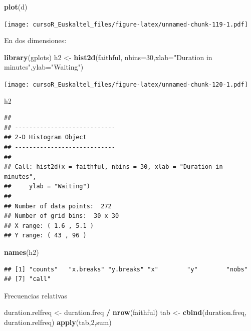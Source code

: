 \documentclass[]{book}
\newenvironment{Shaded}{\begin{snugshade}}{\end{snugshade}}
\newcommand{\KeywordTok}[1]{\textcolor[rgb]{0.13,0.29,0.53}{\textbf{#1}}}
\newcommand{\DataTypeTok}[1]{\textcolor[rgb]{0.13,0.29,0.53}{#1}}
\newcommand{\DecValTok}[1]{\textcolor[rgb]{0.00,0.00,0.81}{#1}}
\newcommand{\StringTok}[1]{\textcolor[rgb]{0.31,0.60,0.02}{#1}}
\newcommand{\OperatorTok}[1]{\textcolor[rgb]{0.81,0.36,0.00}{\textbf{#1}}}
\newcommand{\NormalTok}[1]{#1}
\begin{document}
\begin{Shaded}
\begin{Highlighting}[]
\KeywordTok{plot}\NormalTok{(d)}
\end{Highlighting}
\end{Shaded}

\texttt{[image: cursoR\_Euskaltel\_files/figure-latex/unnamed-chunk-119-1.pdf]}

En dos dimensiones:

\begin{Shaded}
\begin{Highlighting}[]
\KeywordTok{library}\NormalTok{(gplots)}
\NormalTok{h2 <-}\StringTok{ }\KeywordTok{hist2d}\NormalTok{(faithful, }\DataTypeTok{nbins=}\DecValTok{30}\NormalTok{,}\DataTypeTok{xlab=}\StringTok{"Duration in minutes"}\NormalTok{,}\DataTypeTok{ylab=}\StringTok{"Waiting"}\NormalTok{)}
\end{Highlighting}
\end{Shaded}

\texttt{[image: cursoR\_Euskaltel\_files/figure-latex/unnamed-chunk-120-1.pdf]}

\begin{Shaded}
\begin{Highlighting}[]
\NormalTok{h2}
\end{Highlighting}
\end{Shaded}

\begin{verbatim}
## 
## ----------------------------
## 2-D Histogram Object
## ----------------------------
## 
## Call: hist2d(x = faithful, nbins = 30, xlab = "Duration in minutes", 
##     ylab = "Waiting")
## 
## Number of data points:  272 
## Number of grid bins:  30 x 30 
## X range: ( 1.6 , 5.1 )
## Y range: ( 43 , 96 )
\end{verbatim}

\begin{Shaded}
\begin{Highlighting}[]
\KeywordTok{names}\NormalTok{(h2)}
\end{Highlighting}
\end{Shaded}

\begin{verbatim}
## [1] "counts"   "x.breaks" "y.breaks" "x"        "y"        "nobs"    
## [7] "call"
\end{verbatim}

Frecuencias relativas

\begin{Shaded}
\begin{Highlighting}[]
\NormalTok{duration.relfreq <-}\StringTok{ }\NormalTok{duration.freq }\OperatorTok{/}\StringTok{ }\KeywordTok{nrow}\NormalTok{(faithful) }
\NormalTok{tab <-}\StringTok{ }\KeywordTok{cbind}\NormalTok{(duration.freq, duration.relfreq) }
\KeywordTok{apply}\NormalTok{(tab,}\DecValTok{2}\NormalTok{,sum)}
\end{Highlighting}
\end{Shaded}
\end{document}
